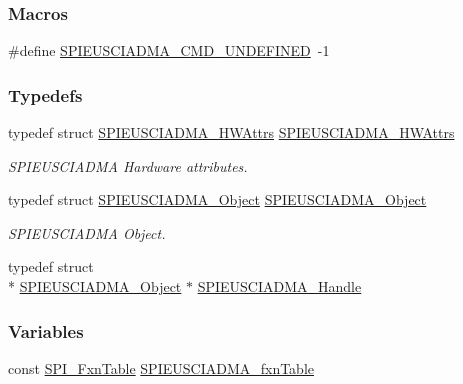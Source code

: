 \subsubsection*{Macros}
\begin{DoxyCompactItemize}
\item 
\#define \hyperlink{_s_p_i_e_u_s_c_i_a_d_m_a_8h_a34a2e6dad4b24e052c205090cb740ed7}{S\-P\-I\-E\-U\-S\-C\-I\-A\-D\-M\-A\-\_\-\-C\-M\-D\-\_\-\-U\-N\-D\-E\-F\-I\-N\-E\-D}~-\/1
\end{DoxyCompactItemize}
\subsubsection*{Typedefs}
\begin{DoxyCompactItemize}
\item 
typedef struct \hyperlink{struct_s_p_i_e_u_s_c_i_a_d_m_a___h_w_attrs}{S\-P\-I\-E\-U\-S\-C\-I\-A\-D\-M\-A\-\_\-\-H\-W\-Attrs} \hyperlink{_s_p_i_e_u_s_c_i_a_d_m_a_8h_a6568ba84990eb85b7857fad2ad8b7287}{S\-P\-I\-E\-U\-S\-C\-I\-A\-D\-M\-A\-\_\-\-H\-W\-Attrs}
\begin{DoxyCompactList}\small\item\em S\-P\-I\-E\-U\-S\-C\-I\-A\-D\-M\-A Hardware attributes. \end{DoxyCompactList}\item 
typedef struct \hyperlink{struct_s_p_i_e_u_s_c_i_a_d_m_a___object}{S\-P\-I\-E\-U\-S\-C\-I\-A\-D\-M\-A\-\_\-\-Object} \hyperlink{_s_p_i_e_u_s_c_i_a_d_m_a_8h_a4126d5130238bf5228a4b403e75108e7}{S\-P\-I\-E\-U\-S\-C\-I\-A\-D\-M\-A\-\_\-\-Object}
\begin{DoxyCompactList}\small\item\em S\-P\-I\-E\-U\-S\-C\-I\-A\-D\-M\-A Object. \end{DoxyCompactList}\item 
typedef struct \\*
\hyperlink{struct_s_p_i_e_u_s_c_i_a_d_m_a___object}{S\-P\-I\-E\-U\-S\-C\-I\-A\-D\-M\-A\-\_\-\-Object} $\ast$ \hyperlink{_s_p_i_e_u_s_c_i_a_d_m_a_8h_a16164ef02768c9a61448d6c0f4d27b29}{S\-P\-I\-E\-U\-S\-C\-I\-A\-D\-M\-A\-\_\-\-Handle}
\end{DoxyCompactItemize}
\subsubsection*{Variables}
\begin{DoxyCompactItemize}
\item 
const \hyperlink{struct_s_p_i___fxn_table}{S\-P\-I\-\_\-\-Fxn\-Table} \hyperlink{_s_p_i_e_u_s_c_i_a_d_m_a_8h_aa7972f6d4283ec2939eb929510b33fa8}{S\-P\-I\-E\-U\-S\-C\-I\-A\-D\-M\-A\-\_\-fxn\-Table}
\end{DoxyCompactItemize}


